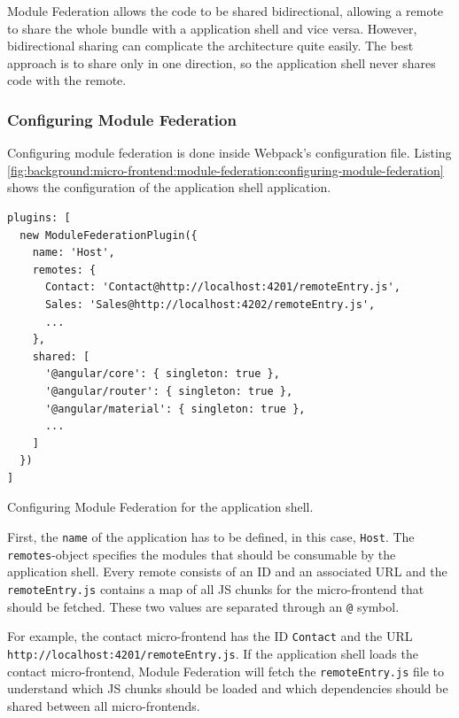 \noindent Module Federation allows the code to be shared bidirectional, allowing a remote to share the whole bundle with a application shell and vice versa. However, bidirectional sharing can complicate the architecture quite easily. The best approach is to share only in one direction, so the application shell never shares code with the remote. \cite[119]{book:2021:mezzalira:applied-methods:building-micro-frontends}

\subsubsection{Configuring Module Federation}\label{subsubsection:background:micro-frontend:module-federation:configuring-module-federation}

Configuring module federation is done inside Webpack's configuration file. Listing \ref{fig:background:micro-frontend:module-federation:configuring-module-federation} shows the configuration of the application shell application.

\ifshowListings
\begin{listing}[H]
  \begin{verbatim}
plugins: [
  new ModuleFederationPlugin({
    name: 'Host',
    remotes: {
      Contact: 'Contact@http://localhost:4201/remoteEntry.js',
      Sales: 'Sales@http://localhost:4202/remoteEntry.js',
      ...
    },
    shared: [
      '@angular/core': { singleton: true },
      '@angular/router': { singleton: true },
      '@angular/material': { singleton: true },
      ...
    ]
  })
]
  \end{verbatim}
  \caption{Configuring Module Federation for the application shell.}\label{fig:background:micro-frontend:module-federation:configuring-module-federation}
\end{listing}
\fi

\noindent First, the \texttt{name} of the application has to be defined, in this case, \texttt{Host}. The \texttt{remotes}-object specifies the modules that should be consumable by the application shell. Every remote consists of an ID and an associated \ac{URL} and the \texttt{remoteEntry.js} contains a map of all \ac{JS} chunks for the micro-frontend that should be fetched. These two values are separated through an \texttt{@} symbol. \cite[124]{book:2021:mezzalira:applied-methods:building-micro-frontends}

\bigskip

\noindent For example, the contact micro-frontend has the ID \texttt{Contact} and the \ac{URL} \texttt{http:\slash \slash localhost:4201\slash remoteEntry.js}. If the application shell loads the contact micro-frontend, Module Federation will fetch the \texttt{remoteEntry.js} file to understand which \ac{JS} chunks should be loaded and which dependencies should be shared between all micro-frontends. \cite[125]{book:2021:mezzalira:applied-methods:building-micro-frontends}

